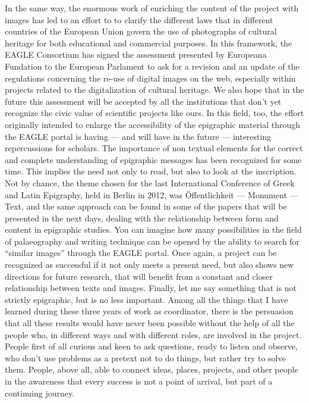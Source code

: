 In the same way, the enormous work of enriching the content of the project with images has led to an effort to to clarify the different laws that in different countries of the European Union govern the use of photographs of cultural heritage for both educational and commercial purposes. In this framework, the EAGLE Consortium has signed the assessment presented by Europeana Fundation to the European Parlament to ask for a revision and an update of the regulations concerning the re-use of digital images on the web, especially within projects related to the digitalization of cultural heritage. We also hope that in the future this assessment will be accepted by all the institutions that don’t yet recognize the civic value of scientific projects like ours.
In this field, too, the effort originally intended to enlarge the accessibility of the epigraphic material through the EAGLE portal is having --- and will have in the future --- interesting repercussions for scholars.
The importance of non textual elements for the correct and complete understanding of epigraphic messages has been recognized for some time. This implies the need not only to read, but also to look at the inscription. Not by chance, the theme chosen for the last International Conference of Greek and Latin Epigraphy, held in Berlin in 2012, was Öffentlichkeit --- Monument --- Text, and the same approach can be found in some of the papers that will be presented in the next days, dealing with the relationship between form and content in epigraphic studies.
You can imagine how many possibilities in the field of palaeography and writing technique can be opened by the ability to search for ``similar images'' through the EAGLE portal. Once again, a project can be recognized as successful if it not only meets a present need, but also shows new directions for future research, that will benefit from a constant and closer relationship between texts and images.
Finally, let me say something that is not strictly epigraphic, but is no less important. Among all the things that I have learned during these three years of work as coordinator, there is the persuasion that all these results would have never been possible without the help of all the people who, in different ways and with different roles, are involved in the project. People first of all curious and keen to ask questions, ready to listen and observe, who don’t use problems as a pretext not to do things, but rather try to solve them. People, above all, able to connect ideas, places, projects, and other people in the awareness that every success is not a point of arrival, but part of a continuing journey.
